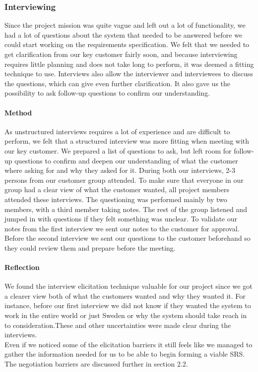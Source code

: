 \documentclass[10pt]{article}
\begin{document}
\subsubsection{Interviewing}
Since the project mission was quite vague and left out a lot of functionality, we had a lot of questions about the system that needed to be answered before we could start working on the requirements specification. We felt that we needed to get clarification from our key customer fairly soon, and because interviewing requires little planning and does not take long to perform, it was deemed a fitting technique to use. Interviews also allow the interviewer and interviewees to discuss the questions, which can give even further clarification. It also gave us the possibility to ask follow-up questions to confirm our understanding.

\paragraph{Method}
\hfill \break
As unstructured interviews requires a lot of experience and are difficult to perform, we felt that a structured interview was more fitting when meeting with our key customer. We prepared a list of questions to ask, but left room for follow-up questions to confirm and deepen our understanding of what the customer where asking for and why they asked for it. During both our interviews, 2-3 persons from our customer group attended. To make sure that everyone in our group had a clear view of what the customer wanted, all project members attended these interviews. The questioning was performed mainly by two members, with a third member taking notes. The rest of the group listened and jumped in with questions if they felt something was unclear. To validate our notes from the first interview we sent our notes to the customer for approval. Before the second interview we sent our questions to the customer beforehand so they could review them and prepare before the meeting.

\paragraph{Reflection}
\hfill \break
We found the interview elicitation technique valuable for our project since we got a clearer view both of what the customers wanted and why they wanted it. For instance, before our first interview we did not know  if they wanted the system to work in the entire world or just Sweden or why the system should take reach in to consideration.These and other uncertainties were made clear during the interviews. \\
\indent Even if we noticed some of the elicitation barriers it still feels like we managed to gather the information needed for us to be able to begin forming a viable SRS. The negotiation barriers are discussed further in section 2.2.  
\end{document}
